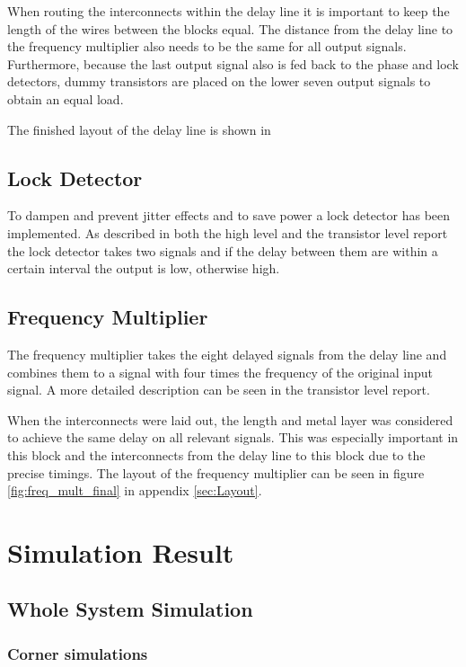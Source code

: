 \documentclass[a4paper,12pt]{article} \usepackage{graphicx}
\begin{document}
When routing the interconnects within the delay line it is important to keep the
length of the wires between the blocks equal. The distance from the delay line
to the frequency multiplier also needs to be the same for all output signals.
Furthermore, because the last output signal also is fed back to the phase and
lock detectors, dummy transistors are placed on the lower seven output signals
to obtain an equal load.

The finished layout of the delay line is shown in %

\subsection{Lock Detector}
To dampen and prevent jitter effects and to save power a lock detector
has been implemented. As described in both the high level and the
transistor level report the lock detector takes two signals and if
the delay between them are within a certain interval the output is
low, otherwise high.
\subsection{Frequency Multiplier}
The frequency multiplier takes the eight delayed signals from the delay line and
combines them to a signal with four times the frequency of the original input
signal. A more detailed description can be seen in the transistor level report\cite{transistor}.

When the interconnects were laid out, the length and metal layer was considered
to achieve the same delay on all relevant signals. This was especially important
in this block and the interconnects from the delay line to this block due to
the precise timings. The layout of the frequency multiplier can be seen in
figure \ref{fig:freq_mult_final} in appendix \ref{sec:Layout}.


\section{Simulation Result}
\subsection{Whole System Simulation}
\subsubsection{Corner simulations}
\end{document}
